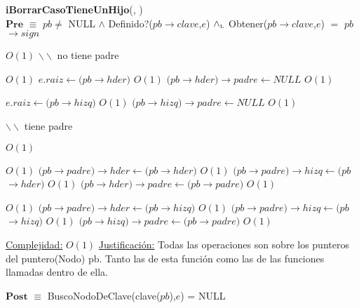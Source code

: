 \begin{algorithm}[H]{\textbf{iBorrarCasoTieneUnHijo}(, )}
	{\\ $\textbf{Pre}$ $\equiv$ $pb \neq$ NULL $\land$ Definido?($pb$$\rightarrow$$clave$,$e$) $\land_{\mathrm{\scriptscriptstyle{L}}}$ Obtener($pb$$\rightarrow$$clave$,$e$) $=$ $pb$$\rightarrow$$sign$}
	\begin{algorithmic}[1]

		 \Comment $O(1)$
			\State $\backslash\backslash$ no tiene padre

			 \Comment $O(1)$
				\State $e.raiz \gets (pb$$\rightarrow$$hder)$ \Comment $O(1)$
				\State $(pb$$\rightarrow$$hder)$$\rightarrow$$padre \gets NULL$ \Comment $O(1)$

			\Else
				\State $e.raiz \gets (pb$$\rightarrow$$hizq)$ \Comment $O(1)$
				\State $(pb$$\rightarrow$$hizq)$$\rightarrow$$padre \gets NULL$ \Comment $O(1)$

			\EndIf

		\Else
			\State $\backslash\backslash$ tiene padre

			 \Comment $O(1)$
				
				 \Comment $O(1)$
					\State $(pb$$\rightarrow$$padre)$$\rightarrow$$hder \gets (pb$$\rightarrow$$hder)$ \Comment $O(1)$
				\Else
					\State $(pb$$\rightarrow$$padre)$$\rightarrow$$hizq \gets (pb$$\rightarrow$$hder)$ \Comment $O(1)$
				\EndIf
				\State $(pb$$\rightarrow$$hder)$$\rightarrow$$padre \gets (pb$$\rightarrow$$padre)$ \Comment $O(1)$
				\\
			\Else

				 \Comment $O(1)$
					\State $(pb$$\rightarrow$$padre)$$\rightarrow$$hder \gets (pb$$\rightarrow$$hizq)$ \Comment $O(1)$
				\Else
					\State $(pb$$\rightarrow$$padre)$$\rightarrow$$hizq \gets (pb$$\rightarrow$$hizq)$ \Comment $O(1)$
				\EndIf
				\State $(pb$$\rightarrow$$hizq)$$\rightarrow$$padre \gets (pb$$\rightarrow$$padre)$ \Comment $O(1)$
				\\

			\EndIf
			
		\EndIf

		\medskip
		\Statex \underline{Complejidad:} $O(1)$
		\Statex \underline{Justificación:} Todas las operaciones son sobre los punteros del puntero(Nodo) pb. Tanto las de esta función como las de las funciones llamadas dentro de ella.

    \end{algorithmic}
    {$\textbf{Post}$ $\equiv$ BuscoNodoDeClave(clave($pb$),$e$) = NULL}
\end{algorithm}


